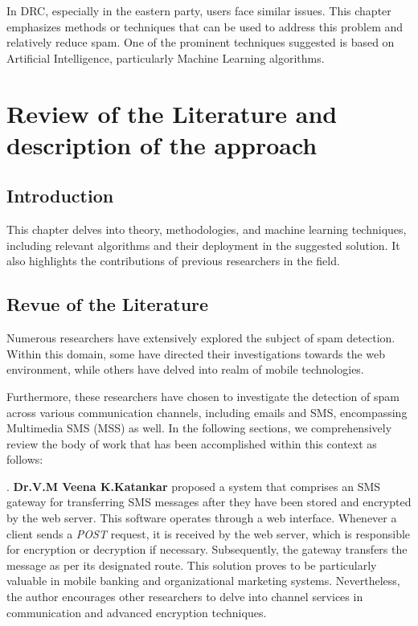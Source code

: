 \documentclass[12pt,a4paper]{report}
\begin{document}
In DRC, especially in the eastern party, users face similar issues. This chapter emphasizes methods or techniques that can be used to address this problem and relatively reduce spam. One of the prominent techniques suggested is based on Artificial Intelligence, particularly Machine Learning algorithms.
    
    \chapter{Review of the Literature and description of the approach}
    \section{Introduction}
    This chapter delves into theory, methodologies, and machine learning techniques, including relevant algorithms and their deployment in the suggested solution. It also highlights the contributions of previous researchers in the field.  
    \section{Revue of the Literature}  
    Numerous researchers have extensively explored the subject of spam detection. Within this domain, some have directed their investigations towards the web environment, while others have delved into realm of mobile	technologies.
    
    Furthermore, these researchers have chosen to investigate the detection of spam across various communication channels, including emails and SMS, encompassing Multimedia SMS (MSS) as well. In the following sections, we comprehensively review the body of work that has been accomplished within this context as follows:
     
	\cite{katankar2010short}. \textbf{Dr.V.M Veena K.Katankar}
	proposed a system that comprises an SMS gateway for transferring SMS messages after they have been stored and encrypted by the web server. This software operates through a web interface. Whenever a client sends a \textit{POST} request, it is received by the web server, which is responsible for encryption or decryption if necessary. Subsequently, the gateway transfers the message as per its designated route. This solution proves to be particularly valuable in mobile banking and organizational marketing systems. Nevertheless, the author encourages other researchers to delve into channel services in communication and advanced encryption techniques.\\
		
\end{document}

